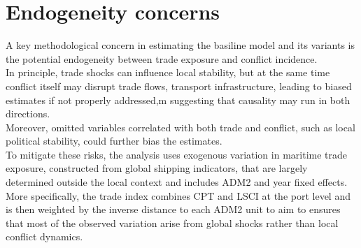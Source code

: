 \section{Endogeneity concerns}
A key methodological concern in estimating the basiline model and its variants is the potential endogeneity between trade exposure and conflict incidence. \\
In principle, trade shocks can influence local stability, but at the same time conflict itself may disrupt trade flows, transport infrastructure, leading to biased estimates if not properly addressed,m suggesting that causality may run in both directions. \\
Moreover, omitted variables correlated with both trade and conflict, such as local political stability, could further bias the estimates. \\

To mitigate these risks, the analysis uses exogenous variation in maritime trade exposure, constructed from global shipping indicators, that are largely determined outside the local context and includes ADM2 and year fixed effects.\\
More specifically, the trade index combines CPT and LSCI at the port level and is then weighted by the inverse distance to each ADM2 unit to aim to ensures that most of the observed variation arise from global shocks rather than local conflict dynamics. \\
